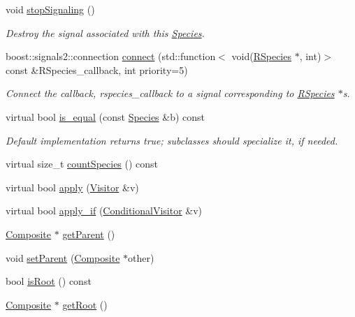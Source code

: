 \begin{DoxyCompactItemize}
void \hyperlink{classchem_1_1Species_a9d34195d05f3e35e00dd20892ff7393b}{stop\-Signaling} ()
\begin{DoxyCompactList}\small\item\em Destroy the signal associated with this \hyperlink{classchem_1_1Species}{Species}. \end{DoxyCompactList}\item 
boost\-::signals2\-::connection \hyperlink{classchem_1_1Species_a9a582e18e231a65761cb10c14d0a0a68}{connect} (std\-::function$<$ void(\hyperlink{classchem_1_1RSpecies}{R\-Species} $\ast$, int)$>$ const \&R\-Species\-\_\-callback, int priority=5)
\begin{DoxyCompactList}\small\item\em Connect the callback, rspecies\-\_\-callback to a signal corresponding to \hyperlink{classchem_1_1RSpecies}{R\-Species} $\ast$s. \end{DoxyCompactList}\item 
virtual bool \hyperlink{classchem_1_1Species_ac01be786c36974eb1e288b1bfdbf02f2}{is\-\_\-equal} (const \hyperlink{classchem_1_1Species}{Species} \&b) const 
\begin{DoxyCompactList}\small\item\em Default implementation returns true; subclasses should specialize it, if needed. \end{DoxyCompactList}\item 
virtual size\-\_\-t \hyperlink{classchem_1_1Species_a5e8aedfe4c4b5e08fb0ee672c3d80ace}{count\-Species} () const 
\item 
virtual bool \hyperlink{classchem_1_1Component_ae9efcf2fb203ab7514f81f04d7e4dec2}{apply} (\hyperlink{classchem_1_1Visitor}{Visitor} \&v)
\item 
virtual bool \hyperlink{classchem_1_1Component_ac40e9d75a554324ba1d007a2d5234a38}{apply\-\_\-if} (\hyperlink{classchem_1_1ConditionalVisitor}{Conditional\-Visitor} \&v)
\item 
\hyperlink{classchem_1_1Composite}{Composite} $\ast$ \hyperlink{classchem_1_1Component_a32812270ee52f07ceae2194c56864fd6}{get\-Parent} ()
\item 
void \hyperlink{classchem_1_1Component_a1f4e4d1566f1d3026f1e2a14fa3dffd9}{set\-Parent} (\hyperlink{classchem_1_1Composite}{Composite} $\ast$other)
\item 
bool \hyperlink{classchem_1_1Component_a75cd13a0d884f82fcddd574de33fbfe6}{is\-Root} () const 
\item 
\hyperlink{classchem_1_1Composite}{Composite} $\ast$ \hyperlink{classchem_1_1Component_a7f1166f8fb4c9526cd1794ec3c2714f5}{get\-Root} ()

\end{DoxyCompactItemize}
